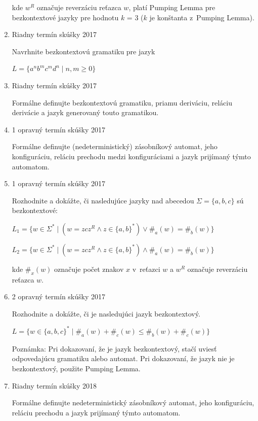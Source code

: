 \documentclass[]{article}
\begin{document}
\begin{enumerate}
		kde $w^R$ označuje reverzáciu reťazca $w$, platí Pumping Lemma pre bezkontextové jazyky pre hodnotu $k$ = 3 ($k$ je konštanta z~Pumping Lemma).
		
		\item Riadny termín skúšky 2017
		
		Navrhnite bezkontextovú gramatiku pre jazyk
		
		$L = \{a^nb^mc^md^n \mid n,m \geq 0\}$
		
		\item Riadny termín skúšky 2017
		
		Formálne definujte bezkontextovú gramatiku, priamu deriváciu, reláciu derivácie a jazyk generovaný touto gramatikou.
		
		\item 1 opravný termín skúšky 2017
		
		Formálne definujte (nedeterministický) zásobníkový automat, jeho konfiguráciu, reláciu prechodu medzi konfiguráciami a jazyk prijímaný týmto automatom.
		
		\item 1 opravný termín skúšky 2017
		
		Rozhodnite a dokážte, či nasledujúce jazyky nad abecedou $\Sigma = \{a,b,c\}$ sú bezkontextové:
		
		$L_1 = \{w \in \Sigma^* \mid (w = zcz^R \land z \in \{a,b\}^*) \lor \#_a(w) = \#_b(w)\}$
		
		$L_2 = \{w \in \Sigma^* \mid (w = zcz^R \land z \in \{a,b\}^*) \land \#_a(w) = \#_b(w)\}$
		
		kde $\#_x(w)$ označuje počet znakov $x$ v~reťazci $w$ a $w^R$ označuje reverzáciu reťazca $w$.
		
		
		\item 2 opravný termín skúšky 2017
		
		Rozhodnite a dokážte, či je nasledujúci jazyk bezkontextový.
		
		$L = \{w \in \{a,b,c\}^* \mid \#_a(w) + \#_c(w) \leq  \#_b(w) +  \#_c(w)\}$
		
		Poznámka: Pri dokazovaní, že je jazyk bezkontextový, stačí uviesť odpovedajúcu gramatiku alebo automat. Pri dokazovaní, že jazyk nie je bezkontextový, použite Pumping Lemma.
		
		\item Riadny termín skúšky 2018
		
		Formálne definujte nedeterministický zásobníkový automat, jeho konfiguráciu, reláciu prechodu a jazyk prijímaný týmto automatom.
		

\end{enumerate}
\end{document}
